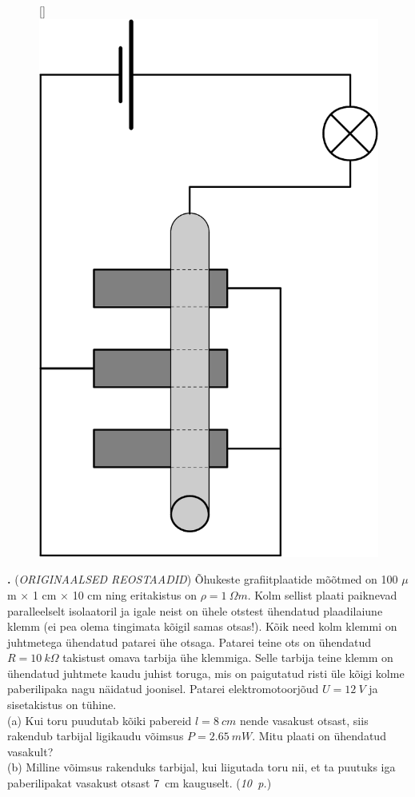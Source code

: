 \documentclass[11pt,a5paper]{article}
\newcommand{\numb}[1]{\vspace{5pt}\textbf{\large #1}}
\newcommand{\nimi}[1]{(\textsl{\small #1})}
\newcommand{\punktid}[1]{(\emph{#1~p.})}
\newcounter{ylesanne}
\newcommand{\yl}[1]{\addtocounter{ylesanne}{1}\numb{\theylesanne.} \nimi{#1} \newblock{}}
\newcommand{\autor}[1]{}%
\begin{document}
\begin{figure}
\raisebox{0pt}[\dimexpr{}\baselineskip\relax]{\includegraphics[scale=0.25]{reostaadid.pdf}}
\end{figure}


\yl{ORIGINAALSED REOSTAADID}
Õhukeste grafiitplaatide mõõtmed on 100 $\mu$m $\times$ 1 cm $\times$ 10 cm ning eritakistus on $\rho =  \SI{1}{\Omega m}$. Kolm sellist plaati paiknevad paralleelselt isolaatoril ja igale neist on ühele otstest ühendatud plaadilaiune klemm (ei pea olema tingimata kõigil samas otsas!). Kõik need kolm klemmi on juhtmetega ühendatud patarei ühe otsaga. Patarei teine ots on ühendatud $R = \SI{10}{k \Omega}$ takistust omava tarbija ühe klemmiga. Selle tarbija teine klemm on ühendatud juhtmete kaudu juhist toruga, mis on paigutatud risti üle kõigi kolme paberilipaka nagu näidatud joonisel. Patarei elektromotoorjõud $U =\SI{12}{V}$ ja sisetakistus on tühine.
\\(a) Kui toru puudutab kõiki pabereid $l = \SI{8}{cm}$ nende vasakust otsast, siis rakendub tarbijal ligikaudu võimsus $P = \SI{2,65}{mW}$. Mitu plaati on ühendatud vasakult? 
\\(b) Milline võimsus rakenduks tarbijal, kui liigutada toru nii, et ta puutuks iga paberilipakat vasakust otsast \SI{7}{cm} kauguselt.
\punktid{10} \autor{Richard Friedrichs}
\end{document}
